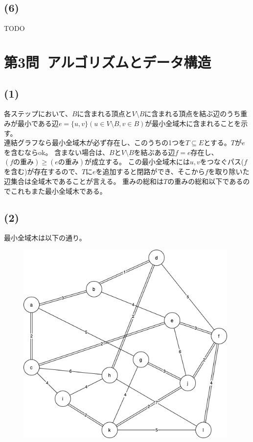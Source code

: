 \documentclass[a4paper,12pt,xelatex,ja=standard]{bxjsarticle}
\begin{document}
\subsection*{(6)}
TODO

\section*{第3問\ アルゴリズムとデータ構造}
\subsection*{(1)}
各ステップにおいて、$B$に含まれる頂点と$V \setminus B$に含まれる頂点を結ぶ辺のうち重みが最小である辺$e = \{u, v\} (u \in V \setminus B, v \in B)$が最小全域木に含まれることを示す。\\
連結グラフなら最小全域木が必ず存在し、このうちの1つを$T \subseteq E$とする。$T$が$e$を含むならok。
含まない場合は、$B$と$V \setminus B$を結ぶある辺$f = e$存在し、$(f\text{の重み}) \geq (e\text{の重み})$が成立する。
この最小全域木には$u, v$をつなぐパス($f$を含む)が存在するので、$T$に$e$を追加すると閉路ができ、そこから$f$を取り除いた辺集合は全域木であることが言える。
重みの総和は$T$の重みの総和以下であるのでこれもまた最小全域木である。

\subsection*{(2)}
最小全域木は以下の通り。
\begin{figure}[H]
  \centering
  \includegraphics[width=11cm]{images/2016_min_spanning_tree.png}
\end{figure}
\end{document}
